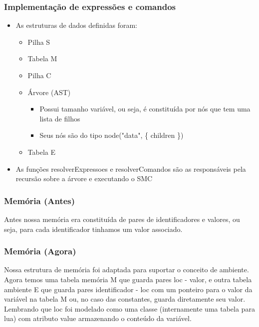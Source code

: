 \documentclass{beamer}
\begin{document}
\begin{frame}
\end{frame}

\begin{frame}
    \frametitle{Implementação de expressões e comandos}
    \begin{itemize}
        \item As estruturas de dados definidas foram:
        \begin{itemize}
            \item Pilha S
            \item Tabela M
            \item Pilha C
            \item Árvore (AST) 
            \begin{itemize}
                \item Possui tamanho variável, ou seja, é constituída por nós que tem uma lista de filhos
                \item Seus nós são do tipo node("data", \{ children \})
            \end{itemize}
            \item Tabela E
        \end{itemize}
        \item As funções resolverExpressoes e resolverComandos são as responsáveis pela recursão sobre a árvore e executando o SMC
    \end{itemize}
\end{frame}

\begin{frame}
    \frametitle{Memória (Antes)}
    Antes nossa memória era constituída de pares de identificadores e valores, ou seja, para cada identificador tinhamos um valor associado.
    
\end{frame}

\begin{frame}
    \frametitle{Memória (Agora)}
    Nossa estrutura de memória foi adaptada para suportar o conceito de ambiente. Agora temos uma tabela memória M que guarda pares loc - valor, e outra tabela ambiente E que guarda pares identificador - loc com um ponteiro para o valor da variável na tabela M ou, no caso das constantes, guarda diretamente seu valor.
    \newline
    \newline
    Lembrando que loc foi modelado como uma classe (internamente uma tabela para lua) com atributo value armazenando o conteúdo da variável.
    
\end{frame}
\end{document}
